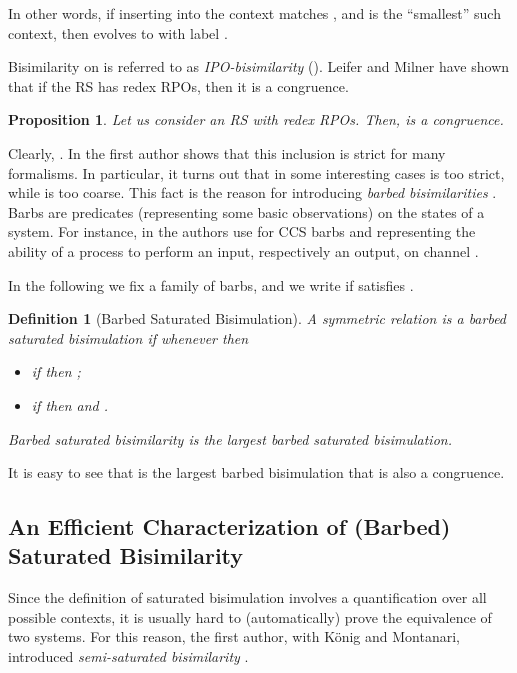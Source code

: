 \documentclass[copyright,creativecommons]{eptcs}
\newcommand{\<}{\langle}
\renewcommand{\>}{\rangle}
\newtheorem{definition}{Definition}{}
\newtheorem{proposition}{Proposition}{}
\begin{document}
In other words, if inserting  into the context  matches
, and  is the ``smallest'' such context,
then  evolves to  with label .


Bisimilarity on  is referred to as \emph{IPO-bisimilarity}
().  Leifer and Milner have shown that if the RS has redex
RPOs, then it is a congruence.

\begin{proposition}\label{theoBiggest}
Let us consider an RS with redex RPOs. Then,  is a congruence.
\end{proposition}

Clearly, . In \cite{Bonchithesis} the first
author shows that this inclusion is strict for many formalisms. In
particular, it turns out that in some interesting cases  is
too strict, while  is too coarse. This fact is the reason for
introducing \emph{barbed bisimilarities} \cite{RobinICALP92}. Barbs
are predicates (representing some basic observations) on the states of
a system. For instance, in \cite{RobinICALP92} the authors use for CCS
barbs  and  representing the ability of a
process to perform an input, respectively an output, on channel .


In the following we fix a family  of barbs, and we write
 if  satisfies .

\begin{definition}[Barbed Saturated Bisimulation]\label{def:BSbis}
A symmetric relation  is a \emph{barbed saturated
bisimulation} if whenever  then 
\begin{itemize}
\item if  then ;
\item if  then  and .
\end{itemize}
\emph{Barbed saturated bisimilarity}  is the largest barbed
saturated bisimulation.
\end{definition}

It is easy to see that  is the largest barbed bisimulation
that is also a congruence.

\subsection{An Efficient Characterization of (Barbed) Saturated Bisimilarity}

Since the definition of saturated bisimulation involves a
quantification over all possible contexts, it is usually hard to
(automatically) prove the equivalence of two systems. For this
reason, the first author, with K\"onig and Montanari, introduced
\emph{semi-saturated bisimilarity} \cite{LICS2006}.
\end{document}
